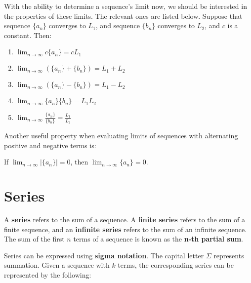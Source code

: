 \documentclass[11pt]{article}
\begin{document}

With the ability to determine a sequence's limit now, we should be interested in the properties of these limits. The relevant ones are listed below. Suppose that sequence $\{a_n\}$ converges to $L_1$, and sequence $\{b_n\}$ converges to $L_2$, and $c$ is a constant. Then:\\

\begin{center}
    \begin{enumerate}
    \item $\lim_{n \to \infty} c\{a_n\} = cL_1$
    \item $\lim_{n \to \infty} (\{a_n\} +\{b_n\}) = L_1+L_2$
    \item $\lim_{n \to \infty} (\{a_n\} -\{b_n\}) = L_1-L_2$
    \item $\lim_{n \to \infty} \{a_n\}\{b_n\} = L_1L_2$
    \item $\lim_{n \to \infty} \frac{\{a_n\}}{\{b_n\}} = \frac{L_1}{L_2}$
\end{enumerate}
\end{center}
\vspace{0.5 cm}

Another useful property when evaluating limits of sequences with alternating positive and negative terms is:\\

\begin{center}
If $\lim_{n \to \infty} |\{a_n\}|=0$, then $\lim_{n \to \infty} \{a_n\}=0$.
\end{center}
\vspace{0.5 cm}



\section{Series}

A \textbf{series} refers to the sum of a sequence. A \textbf{finite series} refers to the sum of a finite sequence, and an \textbf{infinite series} refers to the sum of an infinite sequence. The sum of the first $n$ terms of a sequence is known as the \textbf{n-th partial sum}. 

Series can be expressed using \textbf{sigma notation}. The capital letter $\Sigma$ represents summation. Given a sequence with $k$ terms, the corresponding series can be represented by the following:
\end{document}
